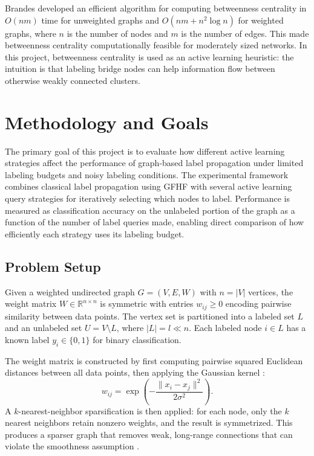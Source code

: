 \documentclass[12pt]{article}
\begin{document}
Brandes \cite{Brandes2001} developed an efficient algorithm for computing betweenness centrality in $O(nm)$ time for unweighted graphs and $O(nm + n^2 \log n)$ for weighted graphs, where $n$ is the number of nodes and $m$ is the number of edges. This made betweenness centrality computationally feasible for moderately sized networks. In this project, betweenness centrality is used as an active learning heuristic: the intuition is that labeling bridge nodes can help information flow between otherwise weakly connected clusters.


\section{Methodology and Goals}

The primary goal of this project is to evaluate how different active learning strategies affect the performance of graph-based label propagation under limited labeling budgets and noisy labeling conditions. The experimental framework combines classical label propagation using GFHF \cite{Zhu2003} with several active learning query strategies for iteratively selecting which nodes to label. Performance is measured as classification accuracy on the unlabeled portion of the graph as a function of the number of label queries made, enabling direct comparison of how efficiently each strategy uses its labeling budget.

\subsection{Problem Setup}

Given a weighted undirected graph $G = (V, E, W)$ with $n = |V|$ vertices, the weight matrix $W \in \mathbb{R}^{n \times n}$ is symmetric with entries $w_{ij} \geq 0$ encoding pairwise similarity between data points. The vertex set is partitioned into a labeled set $L$ and an unlabeled set $U = V \setminus L$, where $|L| = l \ll n$. Each labeled node $i \in L$ has a known label $y_i \in \{0, 1\}$ for binary classification.

The weight matrix is constructed by first computing pairwise squared Euclidean distances between all data points, then applying the Gaussian kernel \cite{Zhu2003}:
\[
w_{ij} = \exp\!\left(-\frac{\|x_i - x_j\|^2}{2\sigma^2}\right).
\]
A $k$-nearest-neighbor sparsification is then applied: for each node, only the $k$ nearest neighbors retain nonzero weights, and the result is symmetrized. This produces a sparser graph that removes weak, long-range connections that can violate the smoothness assumption \cite{Chapelle2006, Zhu2005}.
\end{document}
